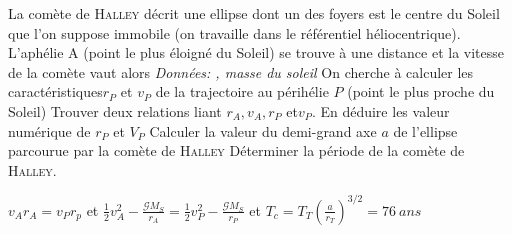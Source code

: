 \begin{Exercise}[title=La comète de Halley]
  La comète de \textsc{Halley} décrit une ellipse dont un des foyers est le centre du
  Soleil que l’on suppose immobile (on travaille dans le référentiel
  héliocentrique). L’aphélie A (point le plus éloigné du Soleil) se trouve à une
  distance  et la vitesse de la comète vaut alors
  \emph{Données: , masse du soleil
    }
  \Question On cherche à calculer les caractéristiques$r_P$ et $v_P$ de la
  trajectoire au périhélie $P$ (point le plus proche du Soleil)
  \subQuestion Trouver deux relations liant $r_A,v_A,r_P$ et$v_P$.
  \subQuestion  En déduire les valeur numérique de $r_P$ et $V_P$
  \Question Calculer la valeur du demi-grand axe $a$ de l'ellipse parcourue par
  la comète de \textsc{Halley}
  \Question Déterminer la période de la comète de \textsc{Halley}.
\end{Exercise}
\begin{Answer}
  \Question \subQuestion $v_Ar_A=v_Pr_p$ et
  $\frac{1}{2}v_A^2-\frac{\mathcal{G}M_S}{r_A}
  =\frac{1}{2}v_P^2-\frac{\mathcal{G}M_S}{r_P}$
  \subQuestion {} et 
  \Question {}
  \Question $T_c=T_T \left(\frac{a}{r_T}\right)^{3/2}=76~ ans$
\end{Answer}
